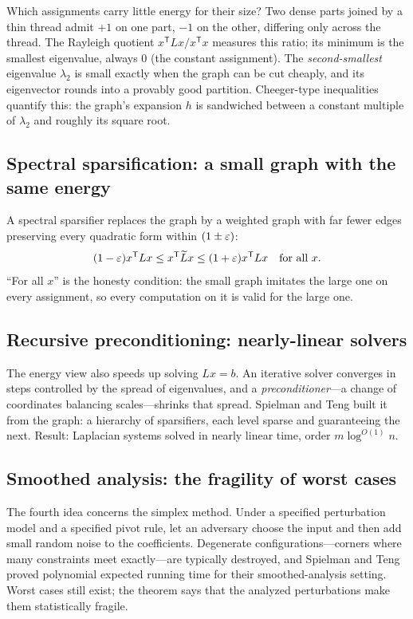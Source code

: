 Which assignments carry little energy for their size? Two dense parts joined by a thin thread admit $+1$ on one part, $-1$ on the other, differing only across the thread. The Rayleigh quotient $x^{\mathsf T}Lx/x^{\mathsf T}x$ measures this ratio; its minimum is the smallest eigenvalue, always $0$ (the constant assignment). The \emph{second-smallest} eigenvalue $\lambda_2$ is small exactly when the graph can be cut cheaply, and its eigenvector rounds into a provably good partition. Cheeger-type inequalities quantify this: the graph's expansion $h$ is sandwiched between a constant multiple of $\lambda_2$ and roughly its square root.

\subsection{Spectral sparsification: a small graph with the same energy}
A spectral sparsifier replaces the graph by a weighted graph with far fewer edges preserving every quadratic form within $(1\pm\varepsilon)$:
\[
(1-\varepsilon)x^{\mathsf T}Lx\leq x^{\mathsf T}\widetilde Lx\leq(1+\varepsilon)x^{\mathsf T}Lx\quad\text{for all }x.
\]
``For all $x$'' is the honesty condition: the small graph imitates the large one on every assignment, so every computation on it is valid for the large one.

\subsection{Recursive preconditioning: nearly-linear solvers}
The energy view also speeds up solving $Lx=b$. An iterative solver converges in steps controlled by the spread of eigenvalues, and a \emph{preconditioner}---a change of coordinates balancing scales---shrinks that spread. Spielman and Teng built it from the graph: a hierarchy of sparsifiers, each level sparse and guaranteeing the next. Result: Laplacian systems solved in nearly linear time, order $m\log^{O(1)}n$.

\subsection{Smoothed analysis: the fragility of worst cases}
The fourth idea concerns the simplex method. Under a specified perturbation model and a specified pivot rule, let an adversary choose the input and then add small random noise to the coefficients. Degenerate configurations---corners where many constraints meet exactly---are typically destroyed, and Spielman and Teng proved polynomial expected running time for their smoothed-analysis setting. Worst cases still exist; the theorem says that the analyzed perturbations make them statistically fragile.


